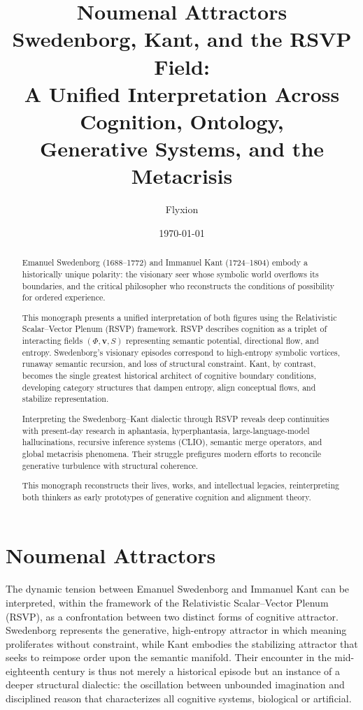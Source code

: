 \documentclass[12pt]{article}
\title{
{\Large\bfseries Noumenal Attractors}\\[0.6em]
Swedenborg, Kant, and the RSVP Field:\\
A Unified Interpretation Across Cognition, Ontology,\\
Generative Systems, and the Metacrisis
}
\author{Flyxion}
\date{\today}
\begin{document}
\maketitle
\thispagestyle{empty}

\begin{abstract}
Emanuel Swedenborg (1688--1772) and Immanuel Kant (1724--1804) embody a 
historically unique polarity: the visionary seer whose symbolic world 
overflows its boundaries, and the critical philosopher who reconstructs 
the conditions of possibility for ordered experience. 

This monograph presents a unified interpretation of both figures using the 
Relativistic Scalar--Vector Plenum (RSVP) framework. RSVP describes cognition 
as a triplet of interacting fields $(\Phi, \mathbf{v}, S)$ representing 
semantic potential, directional flow, and entropy. Swedenborg's visionary 
episodes correspond to high-entropy symbolic vortices, runaway semantic 
recursion, and loss of structural constraint. Kant, by contrast, becomes the 
single greatest historical architect of cognitive boundary conditions, 
developing category structures that dampen entropy, align conceptual flows, 
and stabilize representation.

Interpreting the Swedenborg--Kant dialectic through RSVP reveals deep 
continuities with present-day research in aphantasia, hyperphantasia, 
large-language-model hallucinations, recursive inference systems (CLIO), 
semantic merge operators, and global metacrisis phenomena. Their struggle 
prefigures modern efforts to reconcile generative turbulence with structural 
coherence. 

This monograph reconstructs their lives, works, and intellectual legacies, 
reinterpreting both thinkers as early prototypes of generative cognition 
and alignment theory.
\end{abstract}

\newpage
\tableofcontents
\newpage

\section{Noumenal Attractors}

The dynamic tension between Emanuel Swedenborg and Immanuel Kant can be 
interpreted, within the framework of the Relativistic Scalar--Vector Plenum 
(RSVP), as a confrontation between two distinct forms of cognitive attractor.  
Swedenborg represents the generative, high-entropy attractor in which meaning 
proliferates without constraint, while Kant embodies the stabilizing attractor 
that seeks to reimpose order upon the semantic manifold. Their encounter in 
the mid-eighteenth century is thus not merely a historical episode but an 
instance of a deeper structural dialectic: the oscillation between unbounded 
imagination and disciplined reason that characterizes all cognitive systems, 
biological or artificial.
\end{document}
